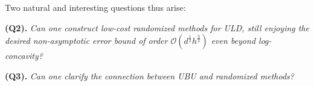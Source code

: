 \documentclass[12pt]{article}
\numberwithin{equation}{section}
\begin{document}
%
%
Two natural and interesting questions thus arise:
\vspace{0.2cm}

{\bf (Q2).} {\it
Can one construct low-cost randomized methods for ULD,
still enjoying the desired non-asymptotic error bound of order $\mathcal{O}(d^{\frac{1}{2}}h^{\frac{3}{2}})$ even beyond log-concavity?
}
\vspace{0.2cm}

{\bf (Q3).} {\it
Can one clarify the connection between UBU and randomized methods?
}
\vspace{0.2cm}
\end{document}
